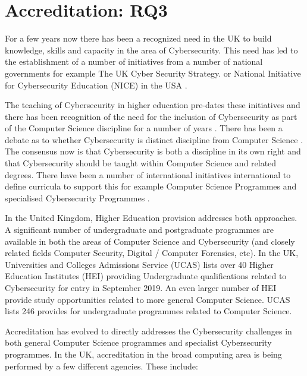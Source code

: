 \documentclass[conference]{IEEEtran}
\begin{document}


\section{Accreditation: RQ3}

For a few years now there has been a recognized need in the UK to build knowledge, skills and capacity in the area of Cybersecurity. This need has led to the establishment of a number of initiatives from a number of national governments for example The UK Cyber Security Strategy. \cite{UKCabinetOffice} or National Initiative for Cybersecurity Education (NICE) in the USA \cite{NICE}. 

The teaching of Cybersecurity in higher education pre-dates these initiatives and there has been recognition of the need for the inclusion of Cybersecurity as part of the Computer Science discipline for a number of years \cite{Hentea2006}. There has  been a debate as to whether Cybersecurity is distinct discipline from Computer Science \cite{McGettreick2013}. The consensus now is that Cybersecurity is both a discipline in its own right and that Cybersecurity should be taught within Computer Science and related degrees. There have been a number of international initiatives international to define curricula to support this for example Computer Science Programmes  \cite[which added ``Information Assurance and Security'' for the first time]{ACM2013a} and specialised Cybersecurity Programmes \cite{ACMIEEEAISSIGSECIFIP}.

In the United Kingdom, Higher Education provision addresses both approaches. A significant number of undergraduate and postgraduate programmes are available in both the areas of Computer Science and Cybersecurity (and closely related fields Computer Security, Digital / Computer Forensics, etc). In the UK, Universities and Colleges Admissions Service (UCAS) lists over 40 Higher Education Institutes (HEI) providing Undergraduate qualifications related to Cybersecurity for entry in September 2019. An even larger number of HEI provide study opportunities related to more general Computer Science. UCAS lists 246 provides for undergraduate programmes related to Computer Science. 

Accreditation has evolved to directly addresses the Cybersecurity challenges in both general Computer Science programmes and specialist Cybersecurity programmes. In the UK, accreditation in the broad computing area is being performed by a few different agencies. These include:
\end{document}
